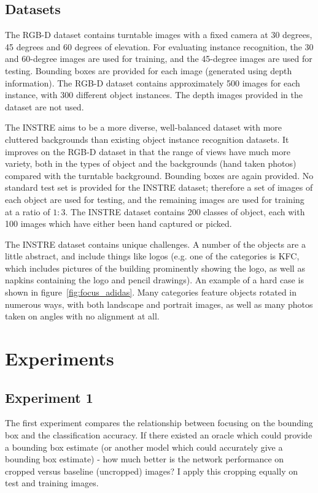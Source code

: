 \subsection{Datasets}

The RGB-D \cite{Lai2011} dataset contains turntable images with a fixed camera at 30 degrees, 45 degrees and 60 degrees of elevation. For evaluating instance recognition, the 30 and 60-degree images are used for training, and the 45-degree images are used for testing. Bounding boxes are provided for each image (generated using depth information). The RGB-D dataset contains approximately 500 images for each instance, with 300 different object instances.  The depth images provided in the dataset are not used.

The INSTRE \cite{Wang2015} aims to be a more diverse, well-balanced dataset with more cluttered backgrounds than existing object instance recognition datasets. It improves on the RGB-D dataset in that the range of views have much more variety, both in the types of object and the backgrounds (hand taken photos) compared with the turntable background. Bounding boxes are again provided. No standard test set is provided for the INSTRE dataset; therefore a set of images of each object are used for testing, and the remaining images are used for training at a ratio of $1:3$. The INSTRE dataset contains 200 classes of object, each with 100 images which have either been hand captured or picked. 

The INSTRE dataset contains unique challenges. A number of the objects are a little abstract, and include things like logos (e.g. one of the categories is KFC, which includes pictures of the building prominently showing the logo, as well as napkins containing the logo and pencil drawings). An example of a hard case is shown in figure~\ref{fig:focus_adidas}. Many categories feature objects rotated in numerous ways, with both landscape and portrait images, as well as many photos taken on angles with no alignment at all.

\section {Experiments}


\subsection {Experiment 1}

The first experiment compares the relationship between focusing on the bounding box and the classification accuracy. If there existed an oracle which could provide a bounding box estimate (or another model which could accurately give a bounding box estimate) - how much better is the network performance on cropped versus baseline (uncropped) images? I apply this cropping equally on test and training images.

